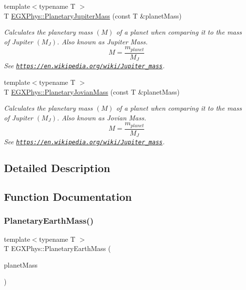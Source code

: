 \begin{DoxyCompactItemize}
{\footnotesize template$<$typename T $>$ }\\T \mbox{\hyperlink{group___e_g_x_phys-_planetary_mass_gaadff5ffa04bb55a572c1403ab9500c06}{E\+G\+X\+Phys\+::\+Planetary\+Jupiter\+Mass}} (const T \&planet\+Mass)
\begin{DoxyCompactList}\small\item\em Calculates the planetary mass $(M)$ of a planet when comparing it to the mass of Jupiter $(M_J)$. Also known as Jupiter Mass. \[M=\frac{m_{planet}}{M_J}\] See \href{https://en.wikipedia.org/wiki/Jupiter_mass}{\tt https\+://en.\+wikipedia.\+org/wiki/\+Jupiter\+\_\+mass}. \end{DoxyCompactList}\item 
{\footnotesize template$<$typename T $>$ }\\T \mbox{\hyperlink{group___e_g_x_phys-_planetary_mass_ga4663e9388a3bd1a20f94beb52021f293}{E\+G\+X\+Phys\+::\+Planetary\+Jovian\+Mass}} (const T \&planet\+Mass)
\begin{DoxyCompactList}\small\item\em Calculates the planetary mass $(M)$ of a planet when comparing it to the mass of Jupiter $(M_J)$. Also known as Jovian Mass. \[M=\frac{m_{planet}}{M_J}\] See \href{https://en.wikipedia.org/wiki/Jupiter_mass}{\tt https\+://en.\+wikipedia.\+org/wiki/\+Jupiter\+\_\+mass}. \end{DoxyCompactList}\end{DoxyCompactItemize}


\subsection{Detailed Description}


\subsection{Function Documentation}
\mbox{\label{group___e_g_x_phys-_planetary_mass_ga3d918c2d37a72b42b49aa6c3da08f450}} 
\subsubsection{\texorpdfstring{Planetary\+Earth\+Mass()}{PlanetaryEarthMass()}}
{\footnotesize\ttfamily template$<$typename T $>$ \\
T E\+G\+X\+Phys\+::\+Planetary\+Earth\+Mass (\begin{DoxyParamCaption}\item[{const T \&}]{planet\+Mass }\end{DoxyParamCaption})}



